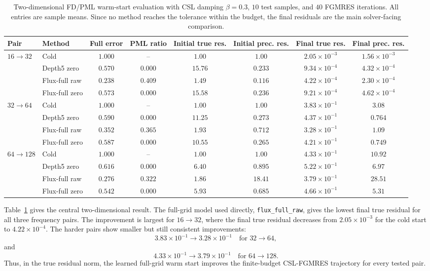 \begin{table}[htbp]
\centering
\caption{Two-dimensional FD/PML warm-start evaluation with CSL damping
$\beta=0.3$, $10$ test samples, and $40$ FGMRES iterations. All entries are
sample means. Since no method reaches the tolerance within the budget, the
final residuals are the main solver-facing comparison.}
\label{tab:results-2d-beta03-precond}
\begin{tabular}{llcccccc}
\toprule
Pair & Method & Full error & PML ratio
& Initial true res. & Initial prec. res.
& Final true res. & Final prec. res. \\
\midrule
$16\to32$ & Cold
& $1.000$ & -- & $1.00$ & $1.00$
& $2.05{\times}10^{-3}$ & $1.56{\times}10^{-3}$ \\
& Depth5 zero
& $0.570$ & $0.000$ & $15.76$ & $0.233$
& $9.34{\times}10^{-4}$ & $4.32{\times}10^{-4}$ \\
& Flux-full raw
& $0.238$ & $0.409$ & $1.49$ & $0.116$
& $4.22{\times}10^{-4}$ & $2.30{\times}10^{-4}$ \\
& Flux-full zero
& $0.573$ & $0.000$ & $15.58$ & $0.236$
& $9.21{\times}10^{-4}$ & $4.62{\times}10^{-4}$ \\
\midrule
$32\to64$ & Cold
& $1.000$ & -- & $1.00$ & $1.00$
& $3.83{\times}10^{-1}$ & $3.08$ \\
& Depth5 zero
& $0.590$ & $0.000$ & $11.25$ & $0.273$
& $4.37{\times}10^{-1}$ & $0.764$ \\
& Flux-full raw
& $0.352$ & $0.365$ & $1.93$ & $0.712$
& $3.28{\times}10^{-1}$ & $1.09$ \\
& Flux-full zero
& $0.587$ & $0.000$ & $10.55$ & $0.265$
& $4.21{\times}10^{-1}$ & $0.749$ \\
\midrule
$64\to128$ & Cold
& $1.000$ & -- & $1.00$ & $1.00$
& $4.33{\times}10^{-1}$ & $10.92$ \\
& Depth5 zero
& $0.616$ & $0.000$ & $6.40$ & $0.895$
& $5.22{\times}10^{-1}$ & $6.97$ \\
& Flux-full raw
& $0.276$ & $0.322$ & $1.86$ & $18.41$
& $3.79{\times}10^{-1}$ & $28.51$ \\
& Flux-full zero
& $0.542$ & $0.000$ & $5.93$ & $0.685$
& $4.66{\times}10^{-1}$ & $5.31$ \\
\bottomrule
\end{tabular}
\end{table}

Table~\ref{tab:results-2d-beta03-precond} gives the central
two-dimensional result. The full-grid model used directly,
\texttt{flux\_full\_raw}, gives the lowest final true residual for all three
frequency pairs. The improvement is largest for $16\to32$, where the final
true residual decreases from $2.05\times10^{-3}$ for the cold start to
$4.22\times10^{-4}$. The harder pairs show smaller but still consistent
improvements:
\[
    3.83\times10^{-1} \to 3.28\times10^{-1}
    \quad\text{for }32\to64,
\]
and
\[
    4.33\times10^{-1} \to 3.79\times10^{-1}
    \quad\text{for }64\to128.
\]
Thus, in the true residual norm, the learned full-grid warm start improves the
finite-budget CSL-FGMRES trajectory for every tested pair.

